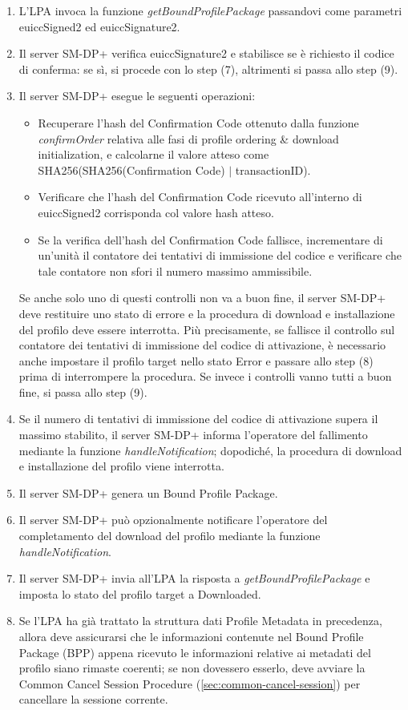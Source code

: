 \documentclass[10pt, oneside]{book}
\begin{document}
\begin{enumerate}
\item L'LPA invoca la funzione \textit{getBoundProfilePackage} passandovi come parametri euiccSigned2 ed euiccSignature2.
\item Il server SM-DP+ verifica euiccSignature2 e stabilisce se è richiesto il codice di conferma: se sì, si procede con lo step (7), altrimenti si passa allo step (9).
\item Il server SM-DP+ esegue le seguenti operazioni:
\begin{itemize}[itemsep=0pt]
\item Recuperare l'hash del Confirmation Code ottenuto dalla funzione \textit{confirmOrder} relativa alle fasi di profile ordering \& download initialization, e calcolarne il valore atteso come SHA256(SHA256(Confirmation Code) $\vert$ transactionID).
\item Verificare che l'hash del Confirmation Code ricevuto all'interno di euiccSigned2 corrisponda col valore hash atteso.
\item Se la verifica dell'hash del Confirmation Code fallisce, incrementare di un'unità il contatore dei tentativi di immissione del codice e verificare che tale contatore non sfori il numero massimo ammissibile.
\end{itemize}
Se anche solo uno di questi controlli non va a buon fine, il server SM-DP+ deve restituire uno stato di errore e la procedura di download e installazione del profilo deve essere interrotta. Più precisamente, se fallisce il controllo sul contatore dei tentativi di immissione del codice di attivazione, è necessario anche impostare il profilo target nello stato Error e passare allo step (8) prima di interrompere la procedura. Se invece i controlli vanno tutti a buon fine, si passa allo step (9).
\item Se il numero di tentativi di immissione del codice di attivazione supera il massimo stabilito, il server SM-DP+ informa l'operatore del fallimento mediante la funzione \textit{handleNotification}; dopodiché, la procedura di download e installazione del profilo viene interrotta.
\item Il server SM-DP+ genera un Bound Profile Package.
\item Il server SM-DP+ può opzionalmente notificare l'operatore del completamento del download del profilo mediante la funzione \textit{handleNotification}.
\item Il server SM-DP+ invia all'LPA la risposta a \textit{getBoundProfilePackage} e imposta lo stato del profilo target a Downloaded.
\item Se l'LPA ha già trattato la struttura dati Profile Metadata in precedenza, allora deve assicurarsi che le informazioni contenute nel Bound Profile Package (BPP) appena ricevuto le informazioni relative ai metadati del profilo siano rimaste coerenti; se non dovessero esserlo, deve avviare la Common Cancel Session Procedure (\ref{sec:common-cancel-session}) per cancellare la sessione corrente.

\end{enumerate}
\end{document}
